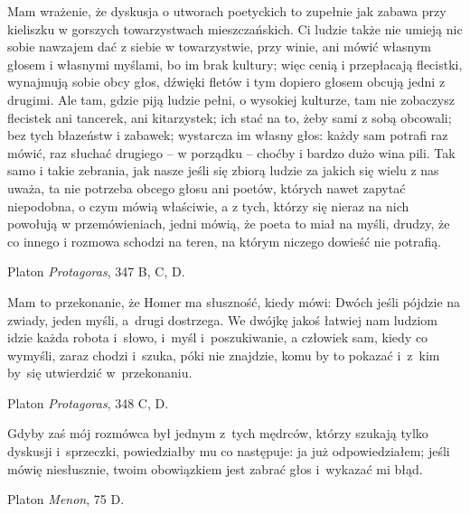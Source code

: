 \documentclass[a4paper,11pt]{article}
\newcommand{\attribA}[1]{#1}
\begin{document}
\noindent
Mam wrażenie, że dyskusja o utworach poetyckich to zupełnie jak zabawa
przy kieliszku w gorszych towarzystwach mieszczańskich. Ci ludzie
także nie umieją nic sobie nawzajem dać z siebie w towarzystwie, przy
winie, ani mówić własnym głosem i własnymi myślami, bo im brak
kultury; więc cenią i przepłacają flecistki, wynajmują sobie obcy
głos, dźwięki fletów i tym dopiero głosem obcują jedni z drugimi. Ale
tam, gdzie piją ludzie pełni, o wysokiej kulturze, tam nie zobaczysz
flecistek ani tancerek, ani kitarzystek; ich stać na to, żeby sami z
sobą obcowali; bez tych błazeństw i zabawek; wystarcza im własny głos:
każdy sam potrafi raz mówić, raz słuchać drugiego -- w porządku --
choćby i bardzo dużo wina pili. Tak samo i takie zebrania, jak nasze
jeśli się zbiorą ludzie za jakich się wielu z nas uważa, ta nie
potrzeba obcego głosu ani poetów, których nawet zapytać niepodobna, o
czym mówią właściwie, a z tych, którzy się nieraz na nich powołują w
przemówieniach, jedni mówią, że poeta to miał na myśli, drudzy, że co
innego i rozmowa schodzi na teren, na którym niczego dowieść nie
potrafią.


\attribA{Platon \textit{Protagoras}, 347 B, C, D.}

\vspace{\spaceThree}



\noindent
Mam to przekonanie, że Homer ma słuszność, kiedy mówi: Dwóch jeśli
pójdzie na zwiady, jeden myśli, a~drugi dostrzega. We dwójkę jakoś
łatwiej nam ludziom idzie każda robota i~słowo, i~myśl i~poszukiwanie,
a człowiek sam, kiedy co wymyśli, zaraz chodzi i~szuka, póki nie
znajdzie, komu by to pokazać i~z~kim by~się utwierdzić w~przekonaniu.


\attribA{Platon \textit{Protagoras}, 348 C, D.}

\vspace{\spaceThree}



\noindent
Gdyby zaś mój rozmówca był jednym z~tych mędrców, którzy szukają tylko
dyskusji i~sprzeczki, powiedziałby mu co następuje: ja już
odpowiedziałem; jeśli mówię niesłusznie, twoim obowiązkiem jest zabrać
głos i~wykazać mi błąd.


\attribA{Platon \textit{Menon}, 75 D.}

\vspace{\spaceThree}
\end{document}
